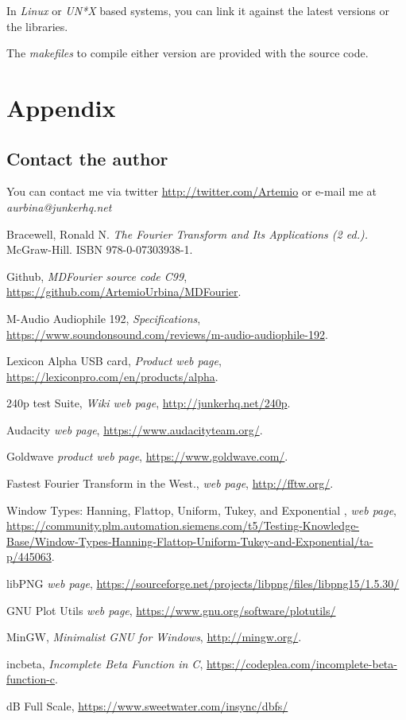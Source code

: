 \documentclass[10pt,a4paper]{report}
\begin{document}
In \textit{Linux} or \textit{UN*X} based systems, you can link it against the latest versions or the libraries.

The \textit{makefiles} to compile either version are provided with the source code\cite{sourcecode}.

\chapter{Appendix}

\section{Contact the author}
\label{contact}

You can contact me via twitter \url{http://twitter.com/Artemio} or e-mail me at \textit{aurbina@junkerhq.net}

\begin{thebibliography}{9}
	Bracewell, Ronald N. 
	\textit{The Fourier Transform and Its Applications (2 ed.).}
	McGraw-Hill. ISBN 978-0-07303938-1.
	
	Github,
	\textit{MDFourier source code C99},
	\url{https://github.com/ArtemioUrbina/MDFourier}.
	
	M-Audio Audiophile 192,
	\textit{Specifications},
	\url{https://www.soundonsound.com/reviews/m-audio-audiophile-192}.
	
	Lexicon Alpha USB card,
	\textit{Product web page},
	\url{https://lexiconpro.com/en/products/alpha}.
	
	240p test Suite,
	\textit{Wiki web page},
	\url{http://junkerhq.net/240p}.
	
	Audacity
	\textit{web page},
	\url{https://www.audacityteam.org/}.
	
	Goldwave
	\textit{product web page},
	\url{https://www.goldwave.com/}.
	
	Fastest Fourier Transform in the West.,
	\textit{web page},
	\url{http://fftw.org/}.
	
	Window Types: Hanning, Flattop, Uniform, Tukey, and Exponential ,
	\textit{web page},
	\url{https://community.plm.automation.siemens.com/t5/Testing-Knowledge-Base/Window-Types-Hanning-Flattop-Uniform-Tukey-and-Exponential/ta-p/445063}.
	
	libPNG
	\textit{web page},
	\url{https://sourceforge.net/projects/libpng/files/libpng15/1.5.30/}
	
	GNU Plot Utils
	\textit{web page},
	\url{https://www.gnu.org/software/plotutils/}
	
	MinGW, 
	\textit{Minimalist GNU for Windows},
	\url{http://mingw.org/}.
	
	incbeta, 
	\textit{Incomplete Beta Function in C},
	\url{https://codeplea.com/incomplete-beta-function-c}.
	
	dB Full Scale, 
	\url{https://www.sweetwater.com/insync/dbfs/}
\end{thebibliography}
\end{document}
